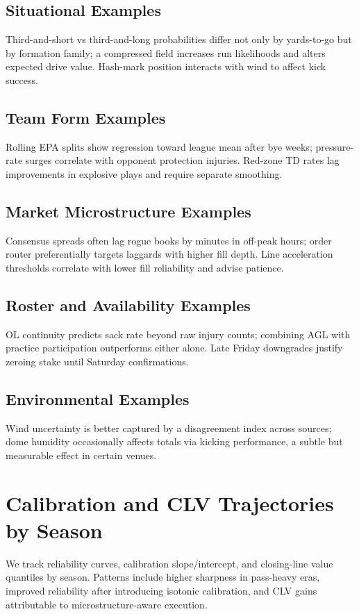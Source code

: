 \subsection{Situational Examples}
Third-and-short vs third-and-long probabilities differ not only by yards-to-go but by formation family; a compressed field increases run likelihoods and alters expected drive value. Hash-mark position interacts with wind to affect kick success.

\subsection{Team Form Examples}
Rolling EPA splits show regression toward league mean after bye weeks; pressure-rate surges correlate with opponent protection injuries. Red-zone TD rates lag improvements in explosive plays and require separate smoothing.

\subsection{Market Microstructure Examples}
Consensus spreads often lag rogue books by minutes in off-peak hours; order router preferentially targets laggards with higher fill depth. Line acceleration thresholds correlate with lower fill reliability and advise patience.

\subsection{Roster and Availability Examples}
OL continuity predicts sack rate beyond raw injury counts; combining AGL with practice participation outperforms either alone. Late Friday downgrades justify zeroing stake until Saturday confirmations.

\subsection{Environmental Examples}
Wind uncertainty is better captured by a disagreement index across sources; dome humidity occasionally affects totals via kicking performance, a subtle but measurable effect in certain venues.

\section{Calibration and CLV Trajectories by Season}\label{app:clv-seasons}
We track reliability curves, calibration slope/intercept, and closing-line value quantiles by season. Patterns include higher sharpness in pass-heavy eras, improved reliability after introducing isotonic calibration, and CLV gains attributable to microstructure-aware execution.

